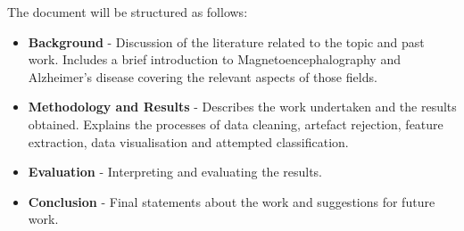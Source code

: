 The document will be structured as follows:\\
\begin{itemize}

\item \textbf{Background} - Discussion of the literature related to the topic and past work. Includes a brief introduction to Magnetoencephalography and Alzheimer's disease covering the relevant aspects of those fields.\\

\item \textbf{Methodology and Results} - Describes the work undertaken and the results obtained. Explains the processes of data cleaning, artefact rejection, feature extraction, data visualisation and attempted classification.\\

\item \textbf{Evaluation} - Interpreting and evaluating the results.\\

\item \textbf{Conclusion} - Final statements about the work and suggestions for future work.\\

\end{itemize}




